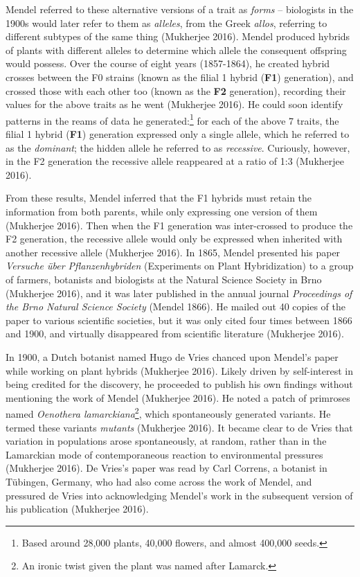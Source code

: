 \documentclass[
]{book}
\begin{document}
Mendel referred to these alternative versions of a trait as \emph{forms} -- biologists in the 1900s would later refer to them as \emph{alleles}, from the Greek \emph{allos}, referring to different subtypes of the same thing (Mukherjee 2016). Mendel produced hybrids of plants with different alleles to determine which allele the consequent offspring would possess. Over the course of eight years (1857-1864), he created hybrid crosses between the F0 strains (known as the filial 1 hybrid (\textbf{F1}) generation), and crossed those with each other too (known as the \textbf{F2} generation), recording their values for the above traits as he went (Mukherjee 2016). He could soon identify patterns in the reams of data he generated:\footnote{Based around 28,000 plants, 40,000 flowers, and almost 400,000 seeds.} for each of the above 7 traits, the filial 1 hybrid (\textbf{F1}) generation expressed only a single allele, which he referred to as the \emph{dominant}; the hidden allele he referred to as \emph{recessive}. Curiously, however, in the F2 generation the recessive allele reappeared at a ratio of 1:3 (Mukherjee 2016).

From these results, Mendel inferred that the F1 hybrids must retain the information from both parents, while only expressing one version of them (Mukherjee 2016). Then when the F1 generation was inter-crossed to produce the F2 generation, the recessive allele would only be expressed when inherited with another recessive allele (Mukherjee 2016). In 1865, Mendel presented his paper \emph{Versuche über Pflanzenhybriden} (Experiments on Plant Hybridization) to a group of farmers, botanists and biologists at the Natural Science Society in Brno (Mukherjee 2016), and it was later published in the annual journal \emph{Proceedings of the Brno Natural Science Society} (Mendel 1866). He mailed out 40 copies of the paper to various scientific societies, but it was only cited four times between 1866 and 1900, and virtually disappeared from scientific literature (Mukherjee 2016).

In 1900, a Dutch botanist named Hugo de Vries chanced upon Mendel's paper while working on plant hybrids (Mukherjee 2016). Likely driven by self-interest in being credited for the discovery, he proceeded to publish his own findings without mentioning the work of Mendel (Mukherjee 2016). He noted a patch of primroses named \emph{Oenothera lamarckiana}\footnote{An ironic twist given the plant was named after Lamarck.}, which spontaneously generated variants. He termed these variants \emph{mutants} (Mukherjee 2016). It became clear to de Vries that variation in populations arose spontaneously, at random, rather than in the Lamarckian mode of contemporaneous reaction to environmental pressures (Mukherjee 2016). De Vries's paper was read by Carl Correns, a botanist in Tübingen, Germany, who had also come across the work of Mendel, and pressured de Vries into acknowledging Mendel's work in the subsequent version of his publication (Mukherjee 2016).
\end{document}
